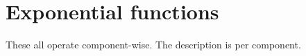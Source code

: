\hypertarget{group__core__func__exponential}{\section{\-Exponential functions}
\label{group__core__func__exponential}
}
\-These all operate component-\/wise. \-The description is per component. 